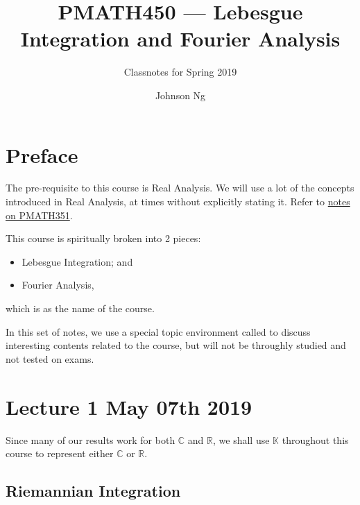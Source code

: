 \documentclass[notoc,notitlepage]{tufte-book}
\title{PMATH450 --- Lebesgue Integration and Fourier Analysis}
\author{Johnson Ng}
\subtitle{Classnotes for Spring 2019}
\begin{document}


\chapter*{Preface}%
\label{chp:preface}

The pre-requisite to this course is Real Analysis. We will use a lot of the
concepts introduced in Real Analysis, at times without explicitly stating it.
Refer to \href{https://tex.japorized.ink/PMATH351F18/classnotes.pdf}{notes on
PMATH351}.

This course is spiritually broken into 2 pieces:
\begin{itemize}
  \item Lebesgue Integration; and
  \item Fourier Analysis,
\end{itemize}
which is as the name of the course.

In this set of notes, we use a special topic environment called
 to discuss interesting contents related to the course, but
will not be throughly studied and not tested on exams.


\chapter{Lecture 1 May 07th 2019}%
\label{chp:lecture_1_may_07th_2019}

Since many of our results work for both $\mathbb{C}$ and $\mathbb{R}$, we shall
use $\mathbb{K}$ throughout this course to represent either $\mathbb{C}$ or
$\mathbb{R}$.

\section{Riemannian Integration}%
\label{sec:riemannian_integration}
\end{document}
